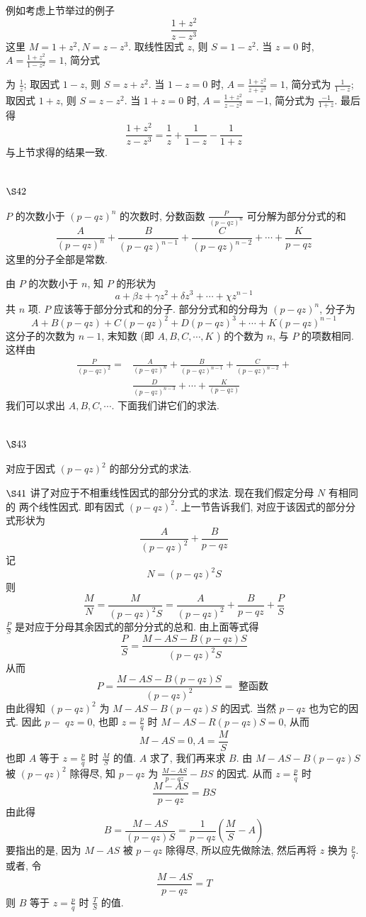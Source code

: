 例如考虑上节举过的例子
\[
\frac{1+z^{2}}{z-z^{3}}
\]
这里 $M=1+z^{2}, N=z-z^{3}$. 取线性因式 $z$, 则 $S=1-z^{2}$. 当 $z=0$ 时, $A=\frac{1+z^{2}}{1-z^{2}}=1$, 简分式 

为 $\frac{1}{z}$; 取因式 $1-z$, 则 $S=z+z^{2}$. 当 $1-z=0$ 时, $A=\frac{1+z^{2}}{z+z^{3}}=1$, 简分式为 $\frac{1}{1-z}$; 取因式 $1+z$, 则 $S=z-z^{2}$. 当 $1+z=0$ 时, $A=\frac{1+z^{2}}{z-z^{2}}=-1$, 简分式为 $\frac{-1}{1+z}$. 最后得
\[
\frac{1+z^{2}}{z-z^{3}}=\frac{1}{z}+\frac{1}{1-z}-\frac{1}{1+z}
\]
与上节求得的结果一致.

\section{$\S 42$}

$P$ 的次数小于 $(p-q z)^{n}$ 的次数时, 分数函数 $\frac{P}{(p-q z)^{n}}$ 可分解为部分分式的和
\[
\frac{A}{(p-q z)^{n}}+\frac{B}{(p-q z)^{n-1}}+\frac{C}{(p-q z)^{n-2}}+\cdots+\frac{K}{p-q z}
\]
这里的分子全部是常数.

由 $P$ 的次数小于 $n$, 知 $P$ 的形状为
\[
a+\beta z+\gamma z^{2}+\delta z^{3}+\cdots+\chi z^{n-1}
\]
共 $n$ 项. $P$ 应该等于部分分式和的分子. 部分分式和的分母为 $(p-q z)^{n}$, 分子为
\[
A+B(p-q z)+C(p-q z)^{2}+D(p-q z)^{3}+\cdots+K(p-q z)^{n-1}
\]
这分子的次数为 $n-1$, 末知数 (即 $A, B, C, \cdots, K$ ) 的个数为 $n$, 与 $P$ 的项数相同. 这样由
\[
\begin{aligned}
\frac{P}{(p-q z)^{2}}= & \frac{A}{(p-q z)^{n}}+\frac{B}{(p-q z)^{n-1}}+\frac{C}{(p-q z)^{n-2}}+ \\
& \frac{D}{(p-q z)^{n-3}}+\cdots+\frac{K}{(p-q z)}
\end{aligned}
\]
我们可以求出 $A, B, C, \cdots$. 下面我们讲它们的求法.

\section{$\S 43$}

对应于因式 $(p-q z)^{2}$ 的部分分式的求法.

$\S 41$ 讲了对应于不相重线性因式的部分分式的求法. 现在我们假定分母 $N$ 有相同的 两个线性因式. 即有因式 $(p-q z)^{2}$. 上一节告诉我们, 对应于该因式的部分分式形状为
\[
\frac{A}{(p-q z)^{2}}+\frac{B}{p-q z}
\]
记
\[
N=(p-q z)^{2} S
\]
则
\[
\frac{M}{N}=\frac{M}{(p-q z)^{2} S}=\frac{A}{(p-q z)^{2}}+\frac{B}{p-q z}+\frac{P}{S}
\]
$\frac{P}{S}$ 是对应于分母其余因式的部分分式的总和. 由上面等式得
\[
\frac{P}{S}=\frac{M-A S-B(p-q z) S}{(p-q z)^{2} S}
\]
从而
\[
P=\frac{M-A S-B(p-q z) S}{(p-q z)^{2}}=\text { 整函数 }
\]
由此得知 $(p-q z)^{2}$ 为 $M-A S-B(p-q z) S$ 的因式. 当然 $p-q z$ 也为它的因式. 因此 $p-$ $q z=0$, 也即 $z=\frac{p}{q}$ 时 $M-A S-R(p-q z) S=0$, 从而
\[
M-A S=0, A=\frac{M}{S}
\]
也即 $A$ 等于 $z=\frac{p}{q}$ 时 $\frac{M}{S}$ 的值. $A$ 求了, 我们再来求 $B$. 由 $M-A S-B(p-q z) S$ 被 $(p-q z)^{2}$ 除得尽, 知 $p-q z$ 为 $\frac{M-A S}{p-q z}-B S$ 的因式. 从而 $z=\frac{p}{q}$ 时
\[
\frac{M-A S}{p-q z}=B S
\]
由此得
\[
B=\frac{M-A S}{(p-q z) S}=\frac{1}{p-q z}\left(\frac{M}{S}-A\right)
\]
要指出的是, 因为 $M-A S$ 被 $p-q z$ 除得尽, 所以应先做除法, 然后再将 $z$ 换为 $\frac{p}{q}$. 或者, 令
\[
\frac{M-A S}{p-q z}=T
\]
则 $B$ 等于 $z=\frac{p}{q}$ 时 $\frac{T}{S}$ 的值.

